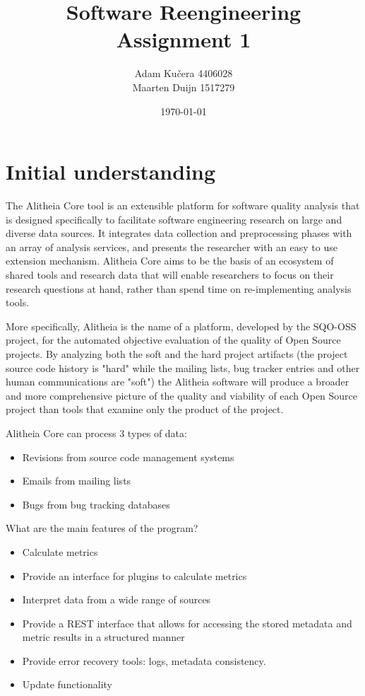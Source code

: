 \documentclass[a4paper,12pt,titlepage]{article}
\author{Adam Ku\v{c}era 4406028\\Maarten Duijn 1517279}
\title{Software Reengineering Assignment 1}
\date{\today}
\begin{document}
\maketitle

\section{Initial understanding}
The Alitheia Core tool is an extensible platform for software quality analysis that is designed specifically to facilitate software engineering research on large and diverse data sources. It integrates data collection and preprocessing phases with an array of analysis services, and presents the researcher with an easy to use extension mechanism. Alitheia Core aims to be the basis of an ecosystem of shared tools and research data that will enable researchers to focus on their research questions at hand, rather than spend time on re-implementing analysis tools.

More specifically, Alitheia is the name of a platform, developed by the SQO-OSS project, for the automated objective evaluation of the quality of Open Source projects. By analyzing both the soft and the hard project artifacts (the project source code history is "hard" while the mailing lists, bug tracker entries and other human communications are "soft") the Alitheia software will produce a broader and more comprehensive picture of the quality and viability of each Open Source project than tools that examine only the product of the project.

Alitheia Core can process 3 types of data:
\begin{itemize}
\item Revisions from source code management systems
\item Emails from mailing lists
\item Bugs from bug tracking databases
\end{itemize}

What are the main features of the program?
\begin{itemize}
\item Calculate metrics
\item Provide an interface for plugins to calculate metrics
\item Interpret data from a wide range of sources
\item Provide a REST interface that allows for accessing the stored metadata and metric results in a structured manner
\item Provide error recovery tools: logs, metadata consistency. %
\item Update functionality %
\end{itemize}
\end{document}
